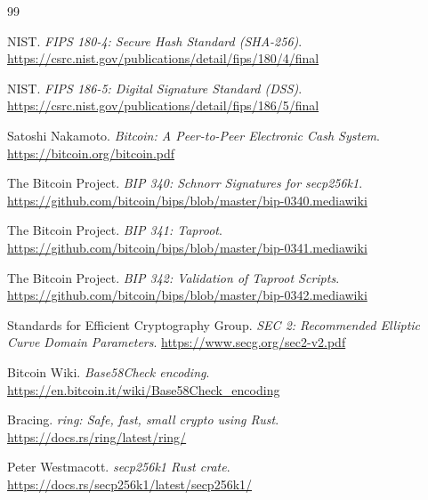 
\begin{thebibliography}{99}

NIST. \emph{FIPS 180-4: Secure Hash Standard (SHA-256)}.
\url{https://csrc.nist.gov/publications/detail/fips/180/4/final}

NIST. \emph{FIPS 186-5: Digital Signature Standard (DSS)}.
\url{https://csrc.nist.gov/publications/detail/fips/186/5/final}

Satoshi Nakamoto. \emph{Bitcoin: A Peer-to-Peer Electronic Cash System}.
\url{https://bitcoin.org/bitcoin.pdf}

The Bitcoin Project. \emph{BIP 340: Schnorr Signatures for secp256k1}.
\url{https://github.com/bitcoin/bips/blob/master/bip-0340.mediawiki}

The Bitcoin Project. \emph{BIP 341: Taproot}.
\url{https://github.com/bitcoin/bips/blob/master/bip-0341.mediawiki}

The Bitcoin Project. \emph{BIP 342: Validation of Taproot Scripts}.
\url{https://github.com/bitcoin/bips/blob/master/bip-0342.mediawiki}

Standards for Efficient Cryptography Group. \emph{SEC 2: Recommended Elliptic Curve Domain Parameters}.
\url{https://www.secg.org/sec2-v2.pdf}

Bitcoin Wiki. \emph{Base58Check encoding}.
\url{https://en.bitcoin.it/wiki/Base58Check_encoding}

Bracing. \emph{ring: Safe, fast, small crypto using Rust}.
\url{https://docs.rs/ring/latest/ring/}

Peter Westmacott. \emph{secp256k1 Rust crate}.
\url{https://docs.rs/secp256k1/latest/secp256k1/}

\end{thebibliography}

